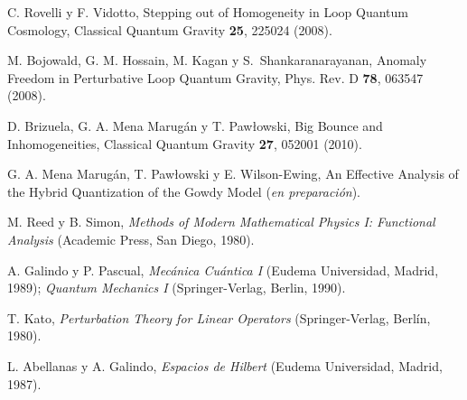 \begin{thebibliography}{999}
 C. Rovelli y F. Vidotto, Stepping out of Homogeneity in
Loop Quantum Cosmology, Classical Quantum Gravity {\bf 25}, 225024 (2008).

 M. Bojowald, G. M. Hossain, M. Kagan y S.~Shankaranarayanan, Anomaly Freedom
in Perturbative Loop Quantum Gravity, Phys. Rev. D {\bf 78}, 063547 (2008).

 D. Brizuela, G. A. Mena Marug\'an y T. Paw{\l}owski, Big Bounce and Inhomogeneities,
Classical Quantum Gravity {\bf27}, 052001 (2010).

 G. A. Mena Marug\'an, T. Paw{\l}owski y E. Wilson-Ewing, An Effective Analysis of the
Hybrid Quantization of the Gowdy Model ({\it{en preparación}}).





 M. Reed y B. Simon, {\it Methods of Modern Mathematical Physics
I: Functional Analysis} (Academic Press, San Diego, 1980).

 A. Galindo y P. Pascual, {\it {Mecánica
Cuántica I}} (Eudema Universidad, Madrid, 1989); {\it{Quantum
Mechanics I}} (Springer-Verlag, Berlin, 1990).

 T. Kato, {\it Perturbation Theory for Linear
Operators} (Springer-Verlag, Berlín, 1980).

 L. Abellanas y A. Galindo, {\it {Espacios de Hilbert}} (Eudema
Universidad, Madrid, 1987).






\end{thebibliography}
